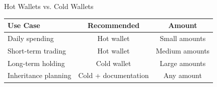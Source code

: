 \documentclass[8pt,aspectratio=169]{beamer}
\begin{document}
\begin{frame}[t]{Hot Wallets vs. Cold Wallets}
\vspace{0.5em}
\begin{center}
\begin{tabular}{lcc}
\toprule
\textbf{Use Case} & \textbf{Recommended} & \textbf{Amount} \\
\midrule
Daily spending & Hot wallet & Small amounts \\
Short-term trading & Hot wallet & Medium amounts \\
Long-term holding & Cold wallet & Large amounts \\
Inheritance planning & Cold + documentation & Any amount \\
\bottomrule
\end{tabular}
\end{center}
\end{frame}
\end{document}
